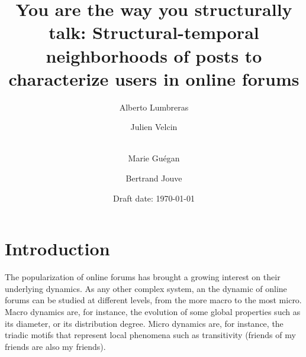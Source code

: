 \documentclass[9pt,technote]{IEEEtran}
\begin{document}
\title{You are the way you structurally talk: Structural-temporal neighborhoods of posts to characterize users in online forums}

\author{Alberto Lumbreras \and
        Julien Velcin  \and\\
        Marie Guégan \and
        Bertrand Jouve
}


\date{Draft date: \today}

\maketitle

\section{Introduction}\label{sec:introduction}

The popularization of online forums has brought a growing interest on their underlying dynamics. As any other complex system, an the dynamic of online forums can be studied at different levels, from the more macro to the most micro. Macro dynamics are, for instance, the evolution of some global properties such as its diameter, or its distribution degree. Micro dynamics are, for instance, the triadic motifs that represent local phenomena such as transitivity (friends of my friends are also my friends).
\end{document}
